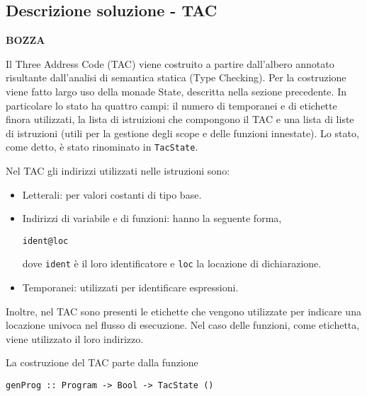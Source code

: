 \subsection{Descrizione soluzione - TAC}
\begin{center}
    {\bf BOZZA}
\end{center}
Il Three Address Code (TAC) viene costruito a partire dall'albero annotato risultante dall'analisi di semantica statica (Type Checking). Per la costruzione viene fatto largo uso della monade State, descritta nella sezione precedente. In particolare lo stato ha quattro campi: il numero di temporanei e di etichette finora utilizzati, la lista di istruizioni che compongono il TAC e una lista di liste di istruzioni (utili per la gestione degli scope e delle funzioni innestate). Lo stato, come detto, è stato rinominato in {\tt TacState}.

Nel TAC gli indirizzi utilizzati nelle istruzioni sono:
\begin{itemize}
    \item Letterali: per valori costanti di tipo base.
    \item Indirizzi di variabile e di funzioni: hanno la seguente forma,
    \begin{center}
        {\tt ident@loc}
    \end{center}
    dove {\tt ident} è il loro identificatore e {\tt loc} la locazione di dichiarazione.
    \item Temporanei: utilizzati per identificare espressioni.
\end{itemize}
Inoltre, nel TAC sono presenti le etichette che vengono utilizzate per indicare una locazione univoca nel flusso di esecuzione. Nel caso delle funzioni, come etichetta, viene utilizzato il loro indirizzo.

La costruzione del TAC parte dalla funzione 
\begin{center}
    {\tt genProg :: Program -> Bool -> TacState ()} 
\end{center}

